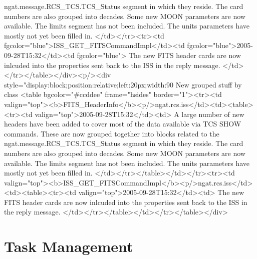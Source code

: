 	    ngat.message.RCS_TCS.TCS_Status segment in which they reside. The card numbers
	    are also grouped into decades. Some new MOON parameters are now available.
	    The limits segment has not been included. The units parameters
	    have mostly not yet been filled in.
	  </td></tr><tr><td fgcolor="blue">ISS_GET_FITSCommandImpl</td><td fgcolor="blue">2005-09-28T15:32</td><td fgcolor="blue">
	    The new FITS header cards are now inlcuded into the properties sent back to the
	    ISS in the reply message.
	  </td></tr></table></div><p/><div style="display:block;position:relative;left:20px;width:90%
     New grouped stuff by class
     <table bgcolor="#ccddee" frame="hsides" border="1"><tr><td valign="top"><b>FITS_HeaderInfo</b><p/>ngat.rcs.iss</td><td><table><tr><td valign="top">2005-09-28T15:32</td><td>
	    A large number of new headers have been added to cover most of the data available
	    via TCS SHOW commands. These are now grouped together into blocks related to the
	    ngat.message.RCS_TCS.TCS_Status segment in which they reside. The card numbers
	    are also grouped into decades. Some new MOON parameters are now available.
	    The limits segment has not been included. The units parameters
	    have mostly not yet been filled in.
	  </td></tr></table></td></tr><tr><td valign="top"><b>ISS_GET_FITSCommandImpl</b><p/>ngat.rcs.iss</td><td><table><tr><td valign="top">2005-09-28T15:32</td><td>
	    The new FITS header cards are now inlcuded into the properties sent back to the
	    ISS in the reply message.
	  </td></tr></table></td></tr></table></div>

    \section{Task Management}


